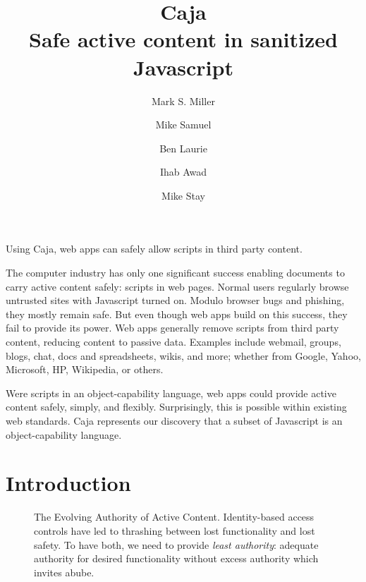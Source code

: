 \documentclass[letterpaper,twocolumn,10pt]{article}
\title{Caja\\
Safe active content in sanitized Javascript}
\author{
        {\rm Mark S. Miller}
        \and 
        {\rm Mike Samuel}
        \and 
        {\rm Ben Laurie}
        \and 
        {\rm Ihab Awad}
        \and 
        {\rm Mike Stay}}
\begin{document}
\maketitle


\abstract

Using Caja, web apps can safely allow scripts in third party content.

The computer industry has only one significant success enabling documents to 
carry active content safely: scripts in web pages. Normal users regularly 
browse untrusted sites with Javascript turned on. Modulo browser bugs and 
phishing, they mostly remain safe. But even though web apps build on this 
success, they fail to provide its power. Web apps generally remove scripts 
from third party content, reducing content to passive data. Examples include 
webmail, groups, blogs, chat, docs and spreadsheets, wikis, and more; whether 
from Google, Yahoo, Microsoft, HP, Wikipedia, or others.

Were scripts in an object-capability language, web apps could provide active 
content safely, simply, and flexibly. Surprisingly, this is possible within 
existing web standards. Caja represents our discovery that a subset of 
Javascript is an object-capability language.

\section{Introduction}

\begin{figure}[t!]
\caption[The Evolving Authority of Active Content]{The Evolving Authority of 
Active Content. Identity-based access controls have led to thrashing between 
lost functionality and lost safety. To have both, we need to provide 
\emph{least authority}: adequate authority for desired functionality without 
excess authority which invites abube.}
  \label{fig:evo-auth}
\end{figure}
\end{document}

